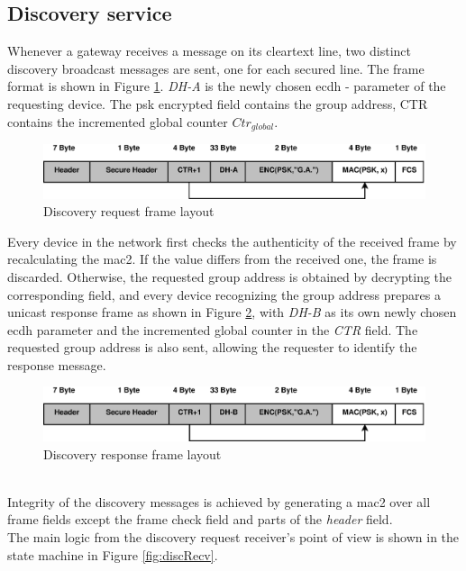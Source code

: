 \subsection{Discovery service}
Whenever a gateway receives a message on its cleartext line, two distinct discovery broadcast messages are sent, one for each secured line. 
The frame format is shown in Figure \ref{fig:discReqFormat}. \textit{DH-A} is the newly chosen \gls{ecdh} - parameter of the requesting device.
The \gls{psk} encrypted field contains the group address, CTR contains the incremented global counter $Ctr_{global}$.
\begin{figure}
  \centering
    \includegraphics[width=1\textwidth]{figures/formatDiscReq.eps}
 \caption{Discovery request frame layout}
 \label{fig:discReqFormat}
\end{figure}
Every device in the network first checks the authenticity of the received frame by recalculating the \gls{mac2}. If the value differs from the received one, the frame
is discarded. Otherwise, the requested group address is obtained by decrypting the corresponding field, and 
every device recognizing the group address prepares a unicast response frame as shown in Figure \ref{fig:discResFormat}, 
with \textit{DH-B} as its own newly chosen \gls{ecdh} parameter and the incremented global counter in the \textit{CTR} field. The requested group address is also
sent, allowing the requester to identify the response message.
\begin{figure}
  \centering
    \includegraphics[width=1\textwidth]{figures/formatDiscResp.eps}
 \caption{Discovery response frame layout}
 \label{fig:discResFormat}
\end{figure}
\\
Integrity of the discovery messages is achieved by generating a \gls{mac2} over all frame fields except the frame check field and parts of the \textit{header}
field. 
\\
The main logic from the discovery request receiver's point of view is shown in the state machine in Figure \ref{fig:discRecv}.

